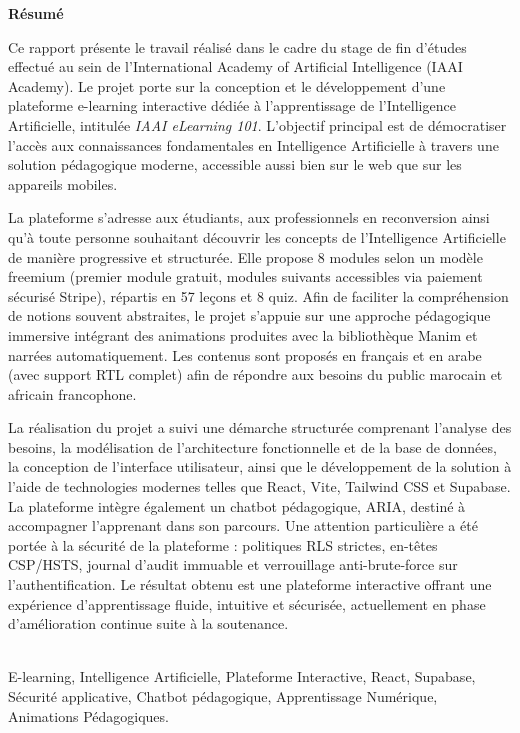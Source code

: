 \documentclass[12pt, a4paper]{report}
\begin{document}
\clearpage
\begin{center}
  {\sffamily\large\bfseries Résumé}
\end{center}
\vspace{0.5cm}
\onehalfspacing
{\selectfont\fontsize{12}{18}\selectfont
Ce rapport présente le travail réalisé dans le cadre du stage de fin d'études effectué au sein de l'International Academy of Artificial Intelligence (IAAI Academy). Le projet porte sur la conception et le développement d'une plateforme e-learning interactive dédiée à l'apprentissage de l'Intelligence Artificielle, intitulée \textit{IAAI eLearning 101}. L'objectif principal est de démocratiser l'accès aux connaissances fondamentales en Intelligence Artificielle à travers une solution pédagogique moderne, accessible aussi bien sur le web que sur les appareils mobiles.

La plateforme s'adresse aux étudiants, aux professionnels en reconversion ainsi qu'à toute personne souhaitant découvrir les concepts de l'Intelligence Artificielle de manière progressive et structurée. Elle propose 8 modules selon un modèle freemium (premier module gratuit, modules suivants accessibles via paiement sécurisé Stripe), répartis en 57 leçons et 8 quiz. Afin de faciliter la compréhension de notions souvent abstraites, le projet s'appuie sur une approche pédagogique immersive intégrant des animations produites avec la bibliothèque Manim et narrées automatiquement. Les contenus sont proposés en français et en arabe (avec support RTL complet) afin de répondre aux besoins du public marocain et africain francophone.

La réalisation du projet a suivi une démarche structurée comprenant l'analyse des besoins, la modélisation de l'architecture fonctionnelle et de la base de données, la conception de l'interface utilisateur, ainsi que le développement de la solution à l'aide de technologies modernes telles que React, Vite, Tailwind CSS et Supabase. La plateforme intègre également un chatbot pédagogique, ARIA, destiné à accompagner l'apprenant dans son parcours. Une attention particulière a été portée à la sécurité de la plateforme : politiques RLS strictes, en-têtes CSP/HSTS, journal d'audit immuable et verrouillage anti-brute-force sur l'authentification. Le résultat obtenu est une plateforme interactive offrant une expérience d'apprentissage fluide, intuitive et sécurisée, actuellement en phase d'amélioration continue suite à la soutenance.
}

\\[0.2cm]
{\selectfont\fontsize{12}{16}\selectfont
E-learning, Intelligence Artificielle, Plateforme Interactive, React, Supabase,
Sécurité applicative, Chatbot pédagogique, Apprentissage Numérique, Animations Pédagogiques.
}
\end{document}
